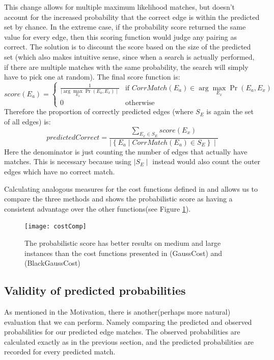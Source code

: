 This change allows for multiple maximum likelihood matches, but doesn't account for the increased probability that the correct edge is within the predicted set by chance. In the extreme case, if the probability score returned the same value for every edge, then this scoring function would judge any pairing as correct. The solution is to discount the score based on the size of the predicted set (which also makes intuitive sense, since when a search is actually performed, if there are multiple matches with the same probability, the search will simply have to pick one at random). The final score function is:
\[
score(E_a) =
\left\{
	\begin{array}{ll}
		\frac{1}{\mid \arg\max_{E_x} \Pr(E_a,E_x) \mid}  & \mbox{if } CorrMatch(E_a) \in \arg\max_{E_x} \Pr(E_a,E_x) \\
		0 & \mbox{otherwise } 
	\end{array}
\right. 
\]
Therefore the proportion of correctly predicted edges (where \(S_E\) is again the set of all edges) is:
\[
predictedCorrect = \frac{\sum_{E_x \in S_E} score(E_x)}{\mid\left\{E_a \mid CorrMatch(E_a) \in S_E\right\}\mid }
\]
Here the denominator is just counting the number of edges that actually have matches. This is necessary because using \(\mid S_E \mid \) instead would also count the outer edges which have no correct match.

Calculating analogous measures for the cost functions defined in \cite{P1} and \cite{P2} allows us to compare the three methods and shows the probabilistic score as having a consistent advantage over the other functions(see Figure \ref{fig:costComp}).

\begin{figure}[h]
\centering
\texttt{[image: costComp]}
\caption{The probabilistic score has better results on medium and large instances than the cost functions presented in \cite{P1} (GaussCost) and \cite{P2} (BlackGaussCost)}
\label{fig:costComp}
\end{figure}

\subsection{Validity of predicted probabilities}
As mentioned in the Motivation, there is another(perhaps more natural) evaluation that we can perform. Namely comparing the predicted and observed probabilities for our predicted edge matches. The observed probabilities are calculated exactly as in the previous section, and the predicted probabilities are recorded for every predicted match. 

